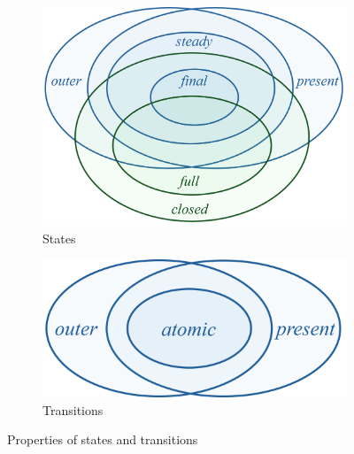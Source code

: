 \documentclass{article}
\begin{document}
\begin{figure}
\centering
\begin{subfigure}{0.4\textwidth}
\centering
\includegraphics[scale=.4]{figs/s-venn}
\caption{States}
\end{subfigure}%
\begin{subfigure}{0.3\textwidth}
\centering
\includegraphics[scale=.4]{figs/t-venn}

\bigskip\bigskip
\caption{Transitions}
\end{subfigure}%
%
\begin{subfigure}{.25\textwidth}
\centering
{}

\bigskip\bigskip
{}
\end{subfigure}
\caption{Properties of states and transitions}
\label{fig:venn}
\end{figure}
\end{document}
